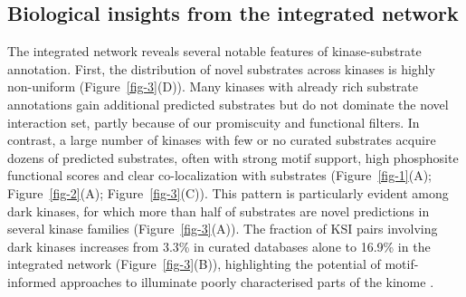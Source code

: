 \documentclass[
  number,
  preprint,
  onecolumn]{elsarticle}
\begin{document}
\subsection{Biological insights from the integrated
network}\label{biological-insights-from-the-integrated-network}

The integrated network reveals several notable features of
kinase-substrate annotation. First, the distribution of novel substrates
across kinases is highly non-uniform (Figure~\ref{fig-3}(D)). Many
kinases with already rich substrate annotations gain additional
predicted substrates but do not dominate the novel interaction set,
partly because of our promiscuity and functional filters. In contrast, a
large number of kinases with few or no curated substrates acquire dozens
of predicted substrates, often with strong motif support, high
phosphosite functional scores and clear co-localization with substrates
(Figure~\ref{fig-1}(A); Figure~\ref{fig-2}(A); Figure~\ref{fig-3}(C)).
This pattern is particularly evident among dark kinases, for which more
than half of substrates are novel predictions in several kinase families
(Figure~\ref{fig-3}(A)). The fraction of KSI pairs involving dark
kinases increases from 3.3\% in curated databases alone to 16.9\% in the
integrated network (Figure~\ref{fig-3}(B)), highlighting the potential
of motif-informed approaches to illuminate poorly characterised parts of
the kinome \citep{Berginski2021-so}.
\end{document}
